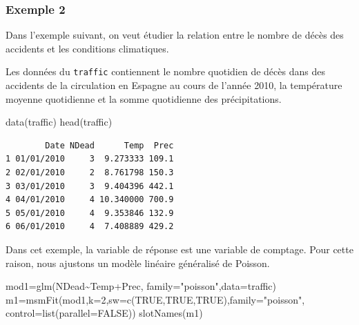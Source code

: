 \documentclass[
  french,
]{article}
\newenvironment{Shaded}{\begin{snugshade}}{\end{snugshade}}
\newcommand{\AttributeTok}[1]{\textcolor[rgb]{0.77,0.63,0.00}{#1}}
\newcommand{\ConstantTok}[1]{\textcolor[rgb]{0.00,0.00,0.00}{#1}}
\newcommand{\DecValTok}[1]{\textcolor[rgb]{0.00,0.00,0.81}{#1}}
\newcommand{\FunctionTok}[1]{\textcolor[rgb]{0.00,0.00,0.00}{#1}}
\newcommand{\NormalTok}[1]{#1}
\newcommand{\OtherTok}[1]{\textcolor[rgb]{0.56,0.35,0.01}{#1}}
\newcommand{\SpecialCharTok}[1]{\textcolor[rgb]{0.00,0.00,0.00}{#1}}
\newcommand{\StringTok}[1]{\textcolor[rgb]{0.31,0.60,0.02}{#1}}
\begin{document}
\hypertarget{exemple-2}{%
\subsubsection{Exemple 2}\label{exemple-2}}

Dans l'exemple suivant, on veut étudier la relation entre le nombre de
décès des accidents et les conditions climatiques.

Les données du \texttt{traffic} contiennent le nombre quotidien de décès
dans des accidents de la circulation en Espagne au cours de l'année
2010, la température moyenne quotidienne et la somme quotidienne des
précipitations.

\begin{Shaded}
\begin{Highlighting}[]
\FunctionTok{data}\NormalTok{(traffic)}
\FunctionTok{head}\NormalTok{(traffic)}
\end{Highlighting}
\end{Shaded}

\begin{verbatim}
        Date NDead      Temp  Prec
1 01/01/2010     3  9.273333 109.1
2 02/01/2010     2  8.761798 150.3
3 03/01/2010     3  9.404396 442.1
4 04/01/2010     4 10.340000 700.9
5 05/01/2010     4  9.353846 132.9
6 06/01/2010     4  7.408889 429.2
\end{verbatim}

Dans cet exemple, la variable de réponse est une variable de comptage.
Pour cette raison, nous ajustons un modèle linéaire généralisé de
Poisson.

\begin{Shaded}
\begin{Highlighting}[]
\NormalTok{mod1}\OtherTok{=}\FunctionTok{glm}\NormalTok{(NDead}\SpecialCharTok{\textasciitilde{}}\NormalTok{Temp}\SpecialCharTok{+}\NormalTok{Prec, }\AttributeTok{family=}\StringTok{"poisson"}\NormalTok{,}\AttributeTok{data=}\NormalTok{traffic)}
\NormalTok{m1}\OtherTok{=}\FunctionTok{msmFit}\NormalTok{(mod1,}\AttributeTok{k=}\DecValTok{2}\NormalTok{,}\AttributeTok{sw=}\FunctionTok{c}\NormalTok{(}\ConstantTok{TRUE}\NormalTok{,}\ConstantTok{TRUE}\NormalTok{,}\ConstantTok{TRUE}\NormalTok{),}\AttributeTok{family=}\StringTok{"poisson"}\NormalTok{,}
          \AttributeTok{control=}\FunctionTok{list}\NormalTok{(}\AttributeTok{parallel=}\ConstantTok{FALSE}\NormalTok{))}
\FunctionTok{slotNames}\NormalTok{(m1)}
\end{Highlighting}
\end{Shaded}
\end{document}
